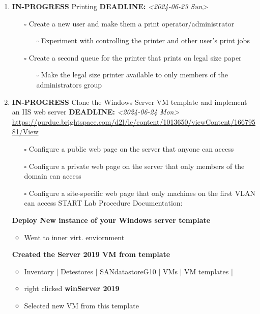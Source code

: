 \documentclass[letterpaper]{article}
\begin{document}
\begin{enumerate}
\item {\bfseries\sffamily IN-PROGRESS} Printing
\label{sec:org3f2da4d}
\noindent\textbf{DEADLINE:} \textit{<2024-06-23 Sun>}\\[0pt]
\begin{itemize}
\item[{$\square$}] Create a new user and make them a print operator/administrator
\begin{itemize}
\item[{$\square$}] Experiment with controlling the printer and other user’s print jobs
\end{itemize}
\item[{$\square$}] Create a second queue for the printer that prints on legal size paper
\begin{itemize}
\item[{$\square$}] Make the legal size printer available to only members of the administrators group
\end{itemize}
\end{itemize}
\item {\bfseries\sffamily IN-PROGRESS} Clone the Windows Server VM template and implement an IIS web server
\label{sec:orge8332c5}
\noindent\textbf{DEADLINE:} \textit{<2024-06-24 Mon>}\\[0pt]
\url{https://purdue.brightspace.com/d2l/le/content/1013650/viewContent/16679581/View}
\begin{itemize}
\item[{$\square$}] Configure a public web page on the server that anyone can access
\item[{$\square$}] Configure a private web page on the server that only members of the domain can access
\item[{$\square$}] Configure a site-specific web page that only machines on the first VLAN can access
START Lab Procedure Documentation:
\end{itemize}
\textbf{Deploy New instance of your Windows server template}
\begin{itemize}
\item Went to inner virt. enviornment
\end{itemize}
\textbf{Created the Server 2019 VM from template}
\begin{itemize}
\item Inventory | Detestores | SANdatastoreG10 | VMs | VM templates |
\item right clicked \textbf{winServer 2019}
\item Selected new VM from this template

\end{itemize}
\end{enumerate}
\end{document}
